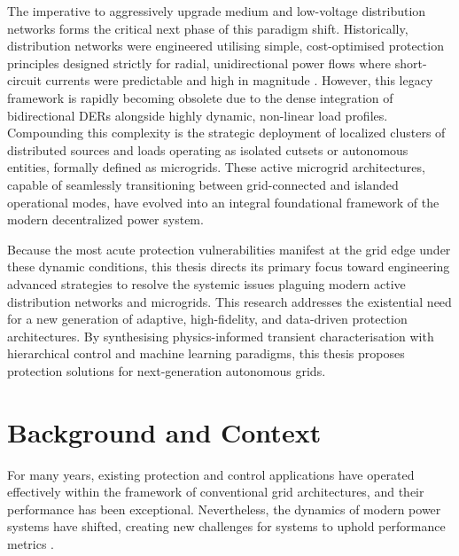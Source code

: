 



The imperative to aggressively upgrade medium and low-voltage distribution networks forms the critical next phase of this paradigm shift. Historically, distribution networks were engineered utilising simple, cost-optimised protection principles designed strictly for radial, unidirectional power flows where short-circuit currents were predictable and high in magnitude \cite{li2025gridforming}. However, this legacy framework is rapidly becoming obsolete due to the dense integration of bidirectional DERs alongside highly dynamic, non-linear load profiles. Compounding this complexity is the strategic deployment of localized clusters of distributed sources and loads operating as isolated cutsets or autonomous entities, formally defined as microgrids. These active microgrid architectures, capable of seamlessly transitioning between grid-connected and islanded operational modes, have evolved into an integral foundational framework of the modern decentralized power system.

Because the most acute protection vulnerabilities manifest at the grid edge under these dynamic conditions, this thesis directs its primary focus toward engineering advanced strategies to resolve the systemic issues plaguing modern active distribution networks and microgrids. This research addresses the existential need for a new generation of adaptive, high-fidelity, and data-driven protection architectures. By synthesising physics-informed transient characterisation with hierarchical control and machine learning paradigms, this thesis proposes protection solutions for next-generation autonomous grids.




\section{Background and Context}

For many years, existing protection and control applications have operated effectively within the framework of conventional grid architectures, and their performance has been exceptional. Nevertheless, the dynamics of modern power systems have shifted, creating new challenges for systems to uphold performance metrics \cite{srivastava2021review}.

